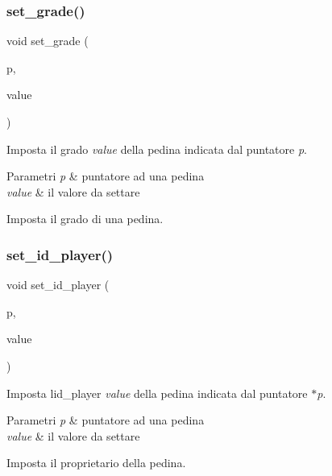 \subsubsection{\texorpdfstring{set\+\_\+grade()}{set\_grade()}}
{\footnotesize\ttfamily void set\+\_\+grade (\begin{DoxyParamCaption}\item[{\hyperlink{ml__lib_8h_a71fee95122b31f5cb0b07d9c16ffa3a5}{pedina} $\ast$}]{p,  }\item[{\hyperlink{ml__lib_8h_a25f6e8adc446355e3f42092ecf9d598c}{gr}}]{value }\end{DoxyParamCaption})}



Imposta il grado {\itshape value} della pedina indicata dal puntatore {\itshape p}. 


\begin{DoxyParams}{Parametri}
{\em p} & puntatore ad una pedina \\
\hline
{\em value} & il valore da settare\\
\hline
\end{DoxyParams}
Imposta il grado di una pedina. \mbox{\label{group__Ausiliarie_gabbdcb7fca0fe313ecc63bc2ba1a73d8e}} 
\subsubsection{\texorpdfstring{set\+\_\+id\+\_\+player()}{set\_id\_player()}}
{\footnotesize\ttfamily void set\+\_\+id\+\_\+player (\begin{DoxyParamCaption}\item[{\hyperlink{ml__lib_8h_a71fee95122b31f5cb0b07d9c16ffa3a5}{pedina} $\ast$}]{p,  }\item[{\hyperlink{ml__lib_8h_a0330ff92cbc796e96c3ce3e4401bf1e1}{id\+\_\+p}}]{value }\end{DoxyParamCaption})}



Imposta l\textquotesingle{}id\+\_\+player {\itshape value} della pedina indicata dal puntatore {\itshape $\ast$p}. 


\begin{DoxyParams}{Parametri}
{\em p} & puntatore ad una pedina \\
\hline
{\em value} & il valore da settare\\
\hline
\end{DoxyParams}
Imposta il proprietario della pedina. 